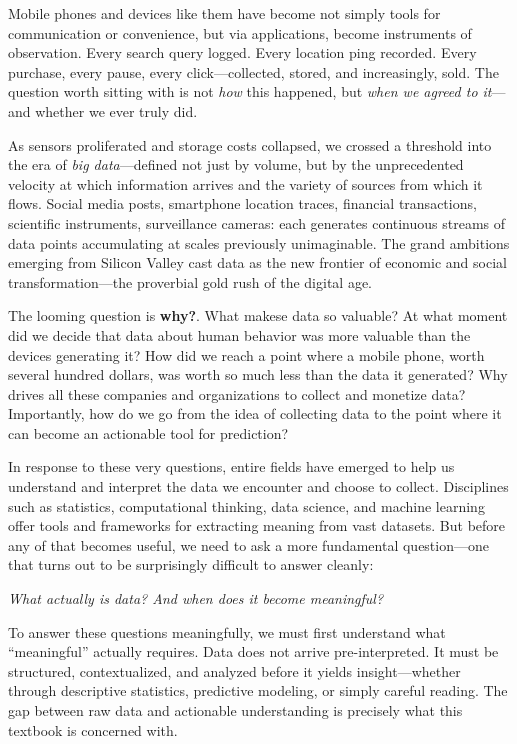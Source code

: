 Mobile phones and devices like them have become not simply tools for communication or convenience, but via applications, become instruments of observation. Every search 
query logged. Every location ping recorded. Every purchase, every pause, every 
click---collected, stored, and increasingly, sold. The question worth sitting 
with is not \textit{how} this happened, but \textit{when we agreed to it}---and 
whether we ever truly did.

As sensors proliferated and storage costs collapsed, we crossed a threshold 
into the era of \textit{big data}---defined not just by volume, but by the 
unprecedented velocity at which information arrives and the variety of sources 
from which it flows. Social media posts, smartphone location traces, financial 
transactions, scientific instruments, surveillance cameras: each generates 
continuous streams of data points accumulating at scales previously 
unimaginable. The grand ambitions emerging from Silicon Valley cast data as 
the new frontier of economic and social transformation---the proverbial gold 
rush of the digital age.

The looming question is \textbf{why?}. What makese data so valuable? At what moment did we decide that data about human behavior was more valuable than the devices generating it?
How did we reach a point where a mobile phone, worth several hundred dollars, was worth so much less than the data it generated? Why drives all these companies and organizations to collect and monetize data?
Importantly, how do we go from the idea of collecting data to the point where it can become an actionable tool for prediction?

In response to these very questions, entire fields have emerged to help us understand 
and interpret the data we encounter and choose to collect. Disciplines such as 
statistics, computational thinking, data science, and machine learning offer 
tools and frameworks for extracting meaning from vast datasets. But before any 
of that becomes useful, we need to ask a more fundamental question---one that 
turns out to be surprisingly difficult to answer cleanly:

\textit{What actually is data? And when does it become meaningful?}

To answer these questions meaningfully, we must first understand what 
``meaningful'' actually requires. Data does not arrive pre-interpreted. 
It must be structured, contextualized, and analyzed before it yields 
insight---whether through descriptive statistics, predictive modeling, 
or simply careful reading. The gap between raw data and actionable 
understanding is precisely what this textbook is concerned with.


